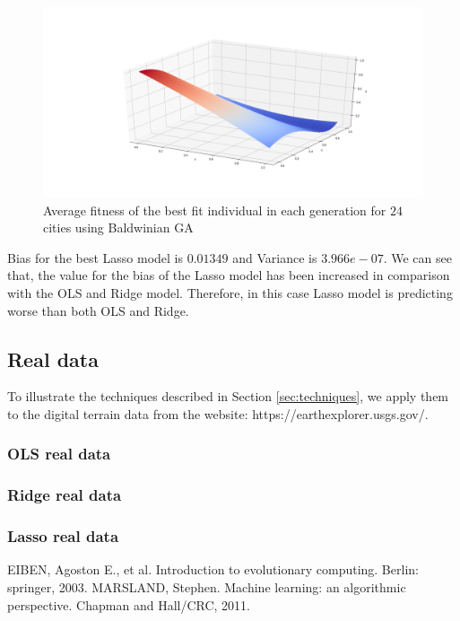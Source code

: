 \documentclass [11pt]{article}
\begin{document}
\begin{figure}[H]
\centering
\includegraphics[width=1\textwidth]{figures/LassoFranke.png}
        \caption{Average fitness of the best fit individual in each generation for $24$ cities using Baldwinian GA}
        \label{fig:LassoFranke}
\end{figure}

Bias for the best Lasso model is $0.01349$ and Variance is $3.966e-07$. We can see that, the value for the bias of the Lasso model has been increased in comparison with the OLS and Ridge model. Therefore, in this case Lasso model is predicting worse than both OLS and Ridge.

\subsection{Real data}
To illustrate the techniques described in Section \ref{sec:techniques}, we apply them to the digital terrain data from the website: https://earthexplorer.usgs.gov/.
\subsubsection{OLS real data}
\subsubsection{Ridge real data}
\subsubsection{Lasso real data}
\begin{thebibliography}{111}
\raggedright
{} EIBEN, Agoston E., et al. Introduction to evolutionary computing. Berlin: springer, 2003.
 MARSLAND, Stephen. Machine learning: an algorithmic perspective. Chapman and Hall/CRC, 2011.

\end{thebibliography}
\end{document}
